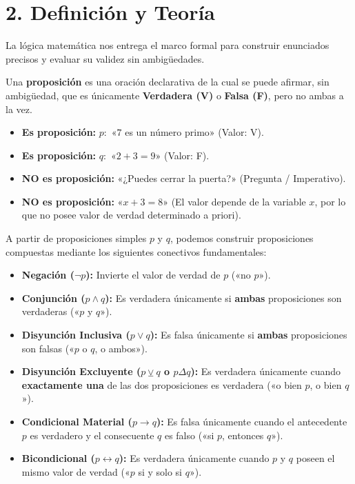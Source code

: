 \documentclass[11pt]{article}
\newenvironment{teoria}{\section*{2. Definición y Teoría}}{}
\newenvironment{definicion}[1]{\begin{tcolorbox}[colback=blue!5,colframe=blue!75!black,title=Definición: #1]}{\end{tcolorbox}}
\begin{document}
\begin{teoria}
  La lógica matemática nos entrega el marco formal para construir enunciados precisos y evaluar su validez sin ambigüedades.

  \begin{definicion}{Proposición Lógica}
    Una \textbf{proposición} es una oración declarativa de la cual se puede afirmar, sin ambigüedad, que es únicamente \textbf{Verdadera (V)} o \textbf{Falsa (F)}, pero no ambas a la vez.
    \begin{itemize}
      \item \textbf{Es proposición:} $p:$ «$7$ es un número primo» (Valor: V).
      \item \textbf{Es proposición:} $q:$ «$2 + 3 = 9$» (Valor: F).
      \item \textbf{NO es proposición:} «¿Puedes cerrar la puerta?» (Pregunta / Imperativo).
      \item \textbf{NO es proposición:} «$x + 3 = 8$» (El valor depende de la variable $x$, por lo que no posee valor de verdad determinado a priori).
    \end{itemize}
  \end{definicion}

  \begin{definicion}{Conectivos Lógicos y Tablas de Verdad}
    A partir de proposiciones simples $p$ y $q$, podemos construir proposiciones compuestas mediante los siguientes conectivos fundamentales:
    \begin{itemize}
      \item \textbf{Negación ($\neg p$):} Invierte el valor de verdad de $p$ («no $p$»).
      \item \textbf{Conjunción ($p \wedge q$):} Es verdadera únicamente si \textbf{ambas} proposiciones son verdaderas («$p$ y $q$»).
      \item \textbf{Disyunción Inclusiva ($p \vee q$):} Es falsa únicamente si \textbf{ambas} proposiciones son falsas («$p$ o $q$, o ambos»).
      \item \textbf{Disyunción Excluyente ($p \veebar q$ o $p \Delta q$):} Es verdadera únicamente cuando \textbf{exactamente una} de las dos proposiciones es verdadera («o bien $p$, o bien $q$»).
      \item \textbf{Condicional Material ($p \rightarrow q$):} Es falsa únicamente cuando el antecedente $p$ es verdadero y el consecuente $q$ es falso («si $p$, entonces $q$»).
      \item \textbf{Bicondicional ($p \leftrightarrow q$):} Es verdadera únicamente cuando $p$ y $q$ poseen el mismo valor de verdad («$p$ si y solo si $q$»).
    \end{itemize}


\end{definicion}
\end{teoria}
\end{document}
